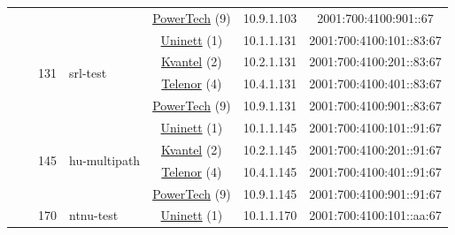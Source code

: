 \begin{small}
\begin{center}
\begin{longtable}{|c|c|c|c|c|c|c|c|}
  &  & \multicolumn{2}{|c|}{} & \multicolumn{2}{|c|}{\tiny{\href{http://www.powertech.no}{PowerTech} (9)}} & \tiny{10.9.1.103} & \tiny{2001:700:4100:901::67} \\* \cline{3-3}\cline{4-4}\cline{5-5}\cline{6-6}\cline{7-7}\cline{8-8}
  &  & \multirow{4}{*}{\tiny{131}} & \multicolumn{1}{|l|}{\multirow{4}{*}{\tiny{srl-test}}} & \multicolumn{2}{|c|}{\tiny{\href{https://www.uninett.no}{Uninett} (1)}} & \tiny{10.1.1.131} & \tiny{2001:700:4100:101::83:67} \\* \cline{5-5}\cline{6-6}\cline{7-7}\cline{8-8}
  &  &  &  & \multicolumn{2}{|c|}{\tiny{\href{http://kvantel.no}{Kvantel} (2)}} & \tiny{10.2.1.131} & \tiny{2001:700:4100:201::83:67} \\* \cline{5-5}\cline{6-6}\cline{7-7}\cline{8-8}
  &  &  &  & \multicolumn{2}{|c|}{\tiny{\href{https://www.telenor.no}{Telenor} (4)}} & \tiny{10.4.1.131} & \tiny{2001:700:4100:401::83:67} \\* \cline{5-5}\cline{6-6}\cline{7-7}\cline{8-8}
  &  &  &  & \multicolumn{2}{|c|}{\tiny{\href{http://www.powertech.no}{PowerTech} (9)}} & \tiny{10.9.1.131} & \tiny{2001:700:4100:901::83:67} \\* \cline{3-3}\cline{4-4}\cline{5-5}\cline{6-6}\cline{7-7}\cline{8-8}
  &  & \multirow{4}{*}{\tiny{145}} & \multicolumn{1}{|l|}{\multirow{4}{*}{\tiny{hu-multipath}}} & \multicolumn{2}{|c|}{\tiny{\href{https://www.uninett.no}{Uninett} (1)}} & \tiny{10.1.1.145} & \tiny{2001:700:4100:101::91:67} \\* \cline{5-5}\cline{6-6}\cline{7-7}\cline{8-8}
  &  &  &  & \multicolumn{2}{|c|}{\tiny{\href{http://kvantel.no}{Kvantel} (2)}} & \tiny{10.2.1.145} & \tiny{2001:700:4100:201::91:67} \\* \cline{5-5}\cline{6-6}\cline{7-7}\cline{8-8}
  &  &  &  & \multicolumn{2}{|c|}{\tiny{\href{https://www.telenor.no}{Telenor} (4)}} & \tiny{10.4.1.145} & \tiny{2001:700:4100:401::91:67} \\* \cline{5-5}\cline{6-6}\cline{7-7}\cline{8-8}
  &  &  &  & \multicolumn{2}{|c|}{\tiny{\href{http://www.powertech.no}{PowerTech} (9)}} & \tiny{10.9.1.145} & \tiny{2001:700:4100:901::91:67} \\* \cline{3-3}\cline{4-4}\cline{5-5}\cline{6-6}\cline{7-7}\cline{8-8}
  &  & \multirow{4}{*}{\tiny{170}} & \multicolumn{1}{|l|}{\multirow{4}{*}{\tiny{ntnu-test}}} & \multicolumn{2}{|c|}{\tiny{\href{https://www.uninett.no}{Uninett} (1)}} & \tiny{10.1.1.170} & \tiny{2001:700:4100:101::aa:67} \\* \cline{5-5}\cline{6-6}\cline{7-7}\cline{8-8}

\end{longtable}
\end{center}
\end{small}
